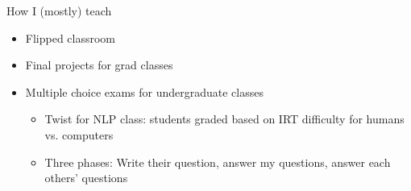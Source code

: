 \documentclass[compress]{beamer}
\begin{document}
\begin{frame}{How I (mostly) teach}

\begin{itemize}
	\item Flipped classroom
	\item Final projects for grad classes
	\item Multiple choice exams for undergraduate classes
\begin{itemize}
	\item Twist for NLP class: students graded based on IRT difficulty for humans vs. computers
	\item Three phases: Write their question, answer my questions, answer each others' questions
\end{itemize}
\end{itemize}
\end{frame}
\end{document}

